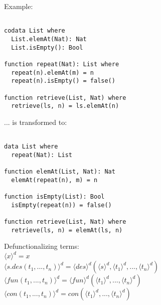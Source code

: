 \documentclass[11pt]{article} %
\begin{document}
Example:

\begin{lstlisting}

codata List where
  List.elemAt(Nat): Nat
  List.isEmpty(): Bool

function repeat(Nat): List where
  repeat(n).elemAt(m) = n
  repeat(n).isEmpty() = false()

function retrieve(List, Nat) where
  retrieve(ls, n) = ls.elemAt(n)

\end{lstlisting}

... is transformed to:

\begin{lstlisting}

data List where
  repeat(Nat): List

function elemAt(List, Nat): Nat
  elemAt(repeat(n), m) = n

function isEmpty(List): Bool
  isEmpty(repeat(n)) = false()

function retrieve(List, Nat) where
  retrieve(ls, n) = elemAt(ls, n)

\end{lstlisting}

Defunctionalizing terms: \\
$\langle x \rangle^d = x$ \\
$\langle s.des(t_1, ..., t_n) \rangle^d = \langle des \rangle^d (\langle s \rangle^d, \langle t_1 \rangle^d, ..., \langle t_n \rangle^d)$ \\
$\langle fun(t_1, ..., t_n) \rangle^d = \langle fun \rangle^d (\langle t_1 \rangle^d, ..., \langle t_n \rangle^d)$ \\
$\langle con(t_1, ..., t_n) \rangle^d = con(\langle t_1 \rangle^d, ..., \langle t_n \rangle^d)$ \\
\end{document}

